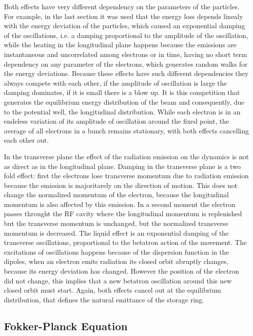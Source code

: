     Both effects have very different dependency on the parameters of the particles. For example, in the last section it was used that the energy loss depends linealy with the energy deviation of the particles, which caused an exponential damping of the oscillations, i.e. a damping proportional to the amplitude of the oscillation, while the heating in the longitudinal plane happens because the emissions are instantaneous and uncorrelated among electrons or in time, having no short term dependency on any parameter of the electrons, which generates random walks for the energy deviations. Because these effects have such different dependencies they always compete with each other, if the amplitude of oscillation is large the damping dominates, if it is small there is a blow up. It is this competition that generates the equilibrium energy distribution of the beam and consequently, due to the potential well, the longitudinal distribution. While each electron is in an endeless variation of its amplitude of oscillation around the fixed point, the average of all electrons in a bunch remains stationary, with both effects cancelling each other out.

    In the transverse plane the effect of the radiation emission on the dynamics is not as direct as in the longitudinal plane. Damping in the transverse plane is a two fold effect: first the electrons lose transverse momentum due to radiation emission because the emission is majoritarely on the direction of motion. This does not change the normalized momentum of the electron, because the longitudinal momentum is also affected by this emission. In a second moment the electron passes throught the RF cavity where the longitudinal momentum is replenished but the transverse momentum is unchanged, but the normalized transverse momentum is decreased. The liquid effect is an exponential damping of the transverse oscillations, proportional to the betatron action of the movement. The excitations of oscillations happens because of the dispersion function in the dipoles, when an electron emits radiation its closed orbit abruptly changes, because its energy deviation has changed. However the position of the electron did not change, this implies that a new betatron oscillation around this new closed orbit must start. Again, both effects cancel out at the equilibrium distribution, that defines the natural emittance of the storage ring.

\subsection{Fokker-Planck Equation}\label{ssec:fokker_planck_equation}

